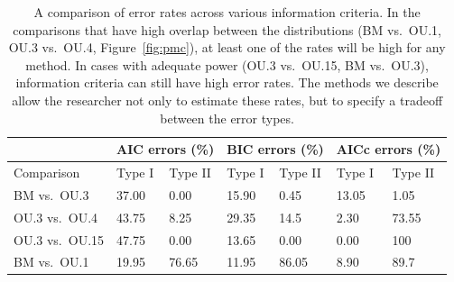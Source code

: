 \begin{table}
\centering
\begin{tabular}{|l|ll|ll|ll|}
\hline
& \multicolumn{2}{|c|}{AIC errors (\%)} & \multicolumn{2}{|c|}{BIC errors (\%)}  & \multicolumn{2}{|c|}{AICc errors (\%)} \\ 
\hline
Comparison & Type I  & Type II & Type I & Type II & Type I & Type II \\
\hline
BM vs.\ OU.3   & 37.00 & 0.00  & 15.90 & 0.45  & 13.05 & 1.05  \\
OU.3 vs.\ OU.4  & 43.75 & 8.25  & 29.35 & 14.5  & 2.30  & 73.55 \\
OU.3 vs.\ OU.15 & 47.75 & 0.00  & 13.65 & 0.00  & 0.00  & 100   \\
BM vs.\ OU.1   & 19.95 & 76.65 & 11.95 & 86.05 & 8.90  & 89.7  \\
\hline
\end{tabular}
\caption{A comparison of error rates across various information criteria. In the comparisons that have high overlap between the distributions (BM vs.\ OU.1, OU.3 vs.\ OU.4, Figure~\ref{fig:pmc}), at least one of the rates will be high for any method.  In cases with adequate power (OU.3 vs.\ OU.15, BM vs.\ OU.3), information criteria can still have high error rates.  The methods we describe allow the researcher not only to estimate these rates, but to specify a tradeoff between the error types.
}
\label{tab:aic_errors}
\end{table}


